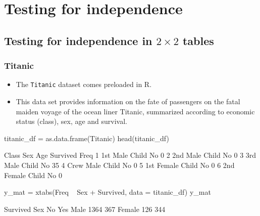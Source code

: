 \documentclass[a4paper]{article}\usepackage[]{graphicx}\usepackage[]{xcolor}
\begin{document}
\section{Testing for independence}\label{sec:8}
\subsection{Testing for independence in \texorpdfstring{\( 2 \times 2 \)}{2 x 2} tables}
\subsubsection{Titanic}
\begin{itemize}
	\item The \lstinline|Titanic| dataset comes preloaded in R.
	\item This data set provides information on the fate of passengers on the fatal maiden voyage of the ocean liner Titanic, summarized according to economic status (class), sex, age and survival.
\end{itemize}
\begin{Schunk}
\begin{Sinput}
titanic_df = as.data.frame(Titanic)
head(titanic_df)
\end{Sinput}
\begin{Soutput}
  Class    Sex   Age Survived Freq
1   1st   Male Child       No    0
2   2nd   Male Child       No    0
3   3rd   Male Child       No   35
4  Crew   Male Child       No    0
5   1st Female Child       No    0
6   2nd Female Child       No    0
\end{Soutput}
\begin{Sinput}
y_mat = xtabs(Freq ~ Sex + Survived,
              data = titanic_df)
y_mat
\end{Sinput}
\begin{Soutput}
        Survived
Sex        No  Yes
  Male   1364  367
  Female  126  344
\end{Soutput}
\end{Schunk}
\end{document}

